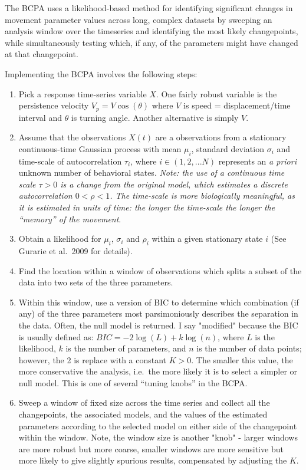 \documentclass[10pt]{article}\usepackage[]{graphicx}\usepackage[]{color}
\newcommand{\ben}{\begin{enumerate}}
\newcommand{\een}{\end{enumerate}}
\newcommand{\I}{\item}
\begin{document}
The BCPA uses a likelihood-based method for identifying significant changes in movement parameter values across long, complex datasets by sweeping an analysis window over the timeseries and identifying the most likely changepoints, while simultaneously testing which, if any, of the parameters might have changed at that changepoint.  

Implementing the BCPA involves the following steps:

\ben
\I Pick a response time-series variable $X$.  One fairly robust variable is the persistence velocity $V_p = V \cos(\theta)$ where $V$ is speed = displacement/time interval and $\theta$ is turning angle.  Another alternative is simply $V$. 

\I Assume that the observations $X(t)$ are a observations from a stationary continuous-time Gaussian process with mean $\mu_i$, standard deviation $\sigma_i$ and time-scale of autocorrelation $\tau_i$, where $i \in (1,2,...N)$ represents an \emph{a priori} unknown number of behavioral states. \emph{Note: the use of a continuous time scale $\tau >0$ is a change from the original model, which estimates a discrete autocorrelation $0 < \rho < 1$.  The time-scale is more biologically meaningful, as it is estimated in units of time: the longer the time-scale the longer the ``memory'' of the movement}.

\I Obtain a likelihood for $\mu_i$, $\sigma_i$ and $\rho_i$ within a given stationary state $i$ (See Gurarie et al.~2009 for details).

\I Find the location within a window of observations which splits a subset of the data into two sets of the three parameters. 

\I Within this window, use a version of BIC to determine which combination (if any) of the three parameters most parsimoniously describes the separation in the data.  Often, the null model is returned.  I say "modified" because the BIC is usually defined as: $BIC = - 2 \log(L) + k \log(n)$, where $L$ is the likelihood, $k$ is the number of parameters, and $n$ is the number of data points; however, the 2 is replace with a constant $K > 0$.  The smaller this value, the more conservative the analysis, i.e.~the more likely it is to select a simpler or null model.  This is one of several ``tuning knobs'' in the BCPA. 

\I Sweep a window of fixed size across the time series and collect all the changepoints, the  associated models, and the values of the estimated parameters according to the selected model on either side of the changepoint within the window.   Note, the window size is another "knob" - larger windows are more robust but more coarse, smaller windows are more sensitive but more likely to give slightly spurious results, compensated by adjusting the $K$.
\een
\end{document}
